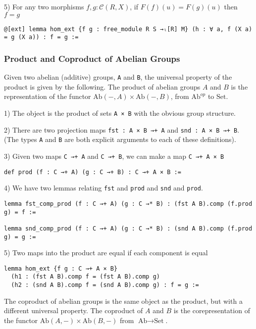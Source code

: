 \documentclass[12pt]{article} %
\theoremstyle{definition}
\theoremstyle{definition}
\theoremstyle{definition}
\theoremstyle{definition}
\begin{document}
5) For any two morphisms $f, g : \mathcal{C}(R, X)$, if $F(f)(u) = F(g)(u)$ then $f = g$
\begin{lstlisting}
@[ext] lemma hom_ext {f g : free_module R S →ₗ[R] M} (h : ∀ a, f (X a) = g (X a)) : f = g :=
\end{lstlisting}

\subsubsection{Product and Coproduct of Abelian Groups}

Given two abelian (additive) groups, \lstinline{A} and \lstinline {B}, 
the universal property of the product is given by the following.
The product of abelian groups $A$ and $B$ is the representation
of the functor $\text{Ab}(-, A) \times \text{Ab}(-, B)$, from
$\text{Ab}^{op}$ to $\text{Set}$.

1) The object is the product of sets \lstinline{A × B} with the obvious
group structure.

2) There are two projection maps \lstinline{fst : A × B →+ A} and 
\lstinline{snd : A × B →+ B}. (The types \lstinline{A} and \lstinline{B}
are both explicit arguments to each of these definitions).

3) Given two maps \lstinline{C →+ A} and \lstinline{C →+ B}, we can make a map
\lstinline{C →+ A × B}
\begin{lstlisting}
def prod (f : C →+ A) (g : C →+ B) : C →+ A × B :=
\end{lstlisting}

4) We have two lemmas relating \lstinline{fst} and \lstinline{prod} and \lstinline{snd}
and \lstinline{prod}.
\begin{lstlisting}
lemma fst_comp_prod (f : C →+ A) (g : C →* B) : (fst A B).comp (f.prod g) = f :=
  
lemma snd_comp_prod (f : C →+ A) (g : C →* B) : (snd A B).comp (f.prod g) = g :=
\end{lstlisting}

5) Two maps into the product are equal if each component is equal
\begin{lstlisting}
lemma hom_ext {f g : C →+ A × B}
  (h1 : (fst A B).comp f = (fst A B).comp g) 
  (h2 : (snd A B).comp f = (snd A B).comp g) : f = g :=
\end{lstlisting}

The coproduct of abelian groups is the same object as the product, 
but with a different universal property. The coproduct of $A$ and $B$
is the corepresentation of the functor $\text{Ab}(A, -) \times \text{Ab}(B, -)$
from $\text{Ab} \to \text{Set}$.
\end{document}
